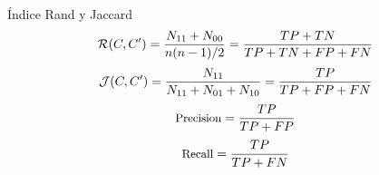 \begin{frame}{\'Indice Rand y Jaccard}
    \begin{equation}\fontsize{9pt}{7.2}\selectfont
        \mathcal{R}(C,C^{\prime}) = \frac{N_{11} + N_{00}}{n(n-1)/2} = \frac{TP + TN}{TP + TN + FP + FN}
    \end{equation}
    \vspace{0.2cm}
    \begin{equation}\fontsize{9pt}{7.2}\selectfont
        \mathcal{J}(C,C^{\prime}) = \frac{N_{11}}{N_{11} + N_{01} + N_{10}} = \frac{TP}{TP + FP + FN}
    \end{equation}
    \vspace{0.2cm}
    \begin{equation}\fontsize{9pt}{7.2}\selectfont
        \text{Precision} = \frac{TP}{TP + FP}
    \end{equation}
    \vspace{0.2cm}
    \begin{equation}\fontsize{9pt}{7.2}\selectfont
        \text{Recall} = \frac{TP}{TP + FN}
    \end{equation}
\end{frame}



    

